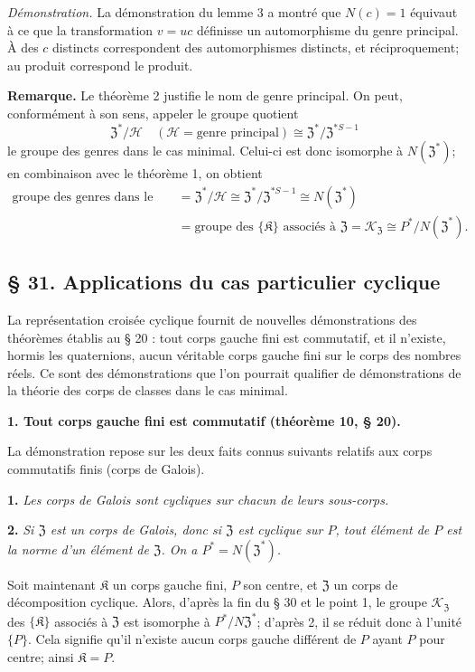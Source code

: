 \noindent\emph{Démonstration.} La démonstration du lemme 3 a montré que \(N(c)=1\) équivaut à ce que la transformation \(v=uc\) définisse un automorphisme du genre principal. À des \(c\) distincts correspondent des automorphismes distincts, et réciproquement; au produit correspond le produit.

\noindent\textbf{Remarque.} Le théorème 2 justifie le nom de genre principal. On peut, conformément à son sens, appeler le groupe quotient
\[
\mathfrak Z^*/\mathscr H
\quad(\mathscr H=\text{genre principal})
\cong\mathfrak Z^*/\mathfrak Z^{*S-1}
\]
le groupe des genres dans le cas minimal. Celui-ci est donc isomorphe à \(N(\mathfrak Z^*)\); en combinaison avec le théorème 1, on obtient
\[
\begin{aligned}
\text{groupe des genres dans le cas minimal}
&=\mathfrak Z^*/\mathscr H
 \cong\mathfrak Z^*/\mathfrak Z^{*S-1}
 \cong N(\mathfrak Z^*)\\
&=\text{groupe des }\{\mathfrak K\}\text{ associés à }\mathfrak Z
 =\mathscr K_{\mathfrak Z}
 \cong P^*/N(\mathfrak Z^*).
\end{aligned}
\]

\subsection*{\S{} 31. Applications du cas particulier cyclique}\label{fr-r823-applications-cas-cyclique}

La représentation croisée cyclique fournit de nouvelles démonstrations des théorèmes établis au \S{} 20 : tout corps gauche fini est commutatif, et il n'existe, hormis les quaternions, aucun véritable corps gauche fini sur le corps des nombres réels. Ce sont des démonstrations que l'on pourrait qualifier de démonstrations de la théorie des corps de classes dans le cas minimal.

\noindent\textbf{1. Tout corps gauche fini est commutatif (théorème 10, \S{} 20).}

La démonstration repose sur les deux faits connus suivants relatifs aux corps commutatifs finis (corps de Galois).

\noindent\textbf{1.} \emph{Les corps de Galois sont cycliques sur chacun de leurs sous-corps.}

\noindent\textbf{2.} \emph{Si \(\mathfrak Z\) est un corps de Galois, donc si \(\mathfrak Z\) est cyclique sur \(P\), tout élément de \(P\) est la norme d'un élément de \(\mathfrak Z\). On a \(P^*=N(\mathfrak Z^*)\).}

Soit maintenant \(\mathfrak K\) un corps gauche fini, \(P\) son centre, et \(\mathfrak Z\) un corps de décomposition cyclique. Alors, d'après la fin du \S{} 30 et le point 1, le groupe \(\mathscr K_{\mathfrak Z}\) des \(\{\mathfrak K\}\) associés à \(\mathfrak Z\) est isomorphe à \(P^*/N\mathfrak Z^*\); d'après 2, il se réduit donc à l'unité \(\{P\}\). Cela signifie qu'il n'existe aucun corps gauche différent de \(P\) ayant \(P\) pour centre; ainsi \(\mathfrak K=P\).

